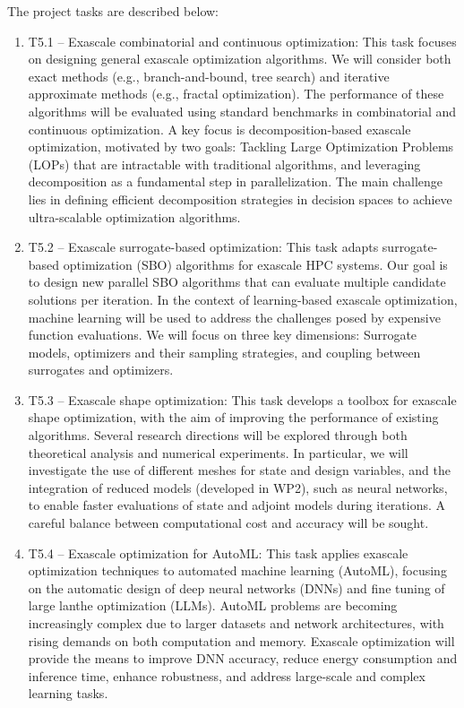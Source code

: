 The project tasks are described below:
\begin{enumerate}
\item T5.1 – Exascale combinatorial and continuous optimization: This task focuses on designing general exascale optimization algorithms. We will consider both exact methods (e.g., branch-and-bound, tree search) and iterative approximate methods (e.g., fractal optimization). The performance of these algorithms will be evaluated using standard benchmarks in combinatorial and continuous optimization. A key focus is decomposition-based exascale optimization, motivated by two goals: Tackling Large Optimization Problems (LOPs) that are intractable with traditional algorithms, and leveraging decomposition as a fundamental step in parallelization. The main challenge lies in defining efficient decomposition strategies in  decision spaces to achieve ultra-scalable optimization algorithms.

 \item T5.2 – Exascale surrogate-based optimization: This task adapts surrogate-based optimization (SBO) algorithms for exascale HPC systems. Our goal is to design new parallel SBO algorithms that can evaluate multiple candidate solutions per iteration. In the context of learning-based exascale optimization, machine learning will be used to address the challenges posed by expensive function evaluations. We will focus on three key dimensions: Surrogate models, optimizers and their sampling strategies, and coupling between surrogates and optimizers.

 \item T5.3 – Exascale shape optimization: This task develops a toolbox for exascale shape optimization, with the aim of improving the performance of existing algorithms. Several research directions will be explored through both theoretical analysis and numerical experiments. In particular, we will investigate the use of different meshes for state and design variables, and the integration of reduced models (developed in WP2), such as neural networks, to enable faster evaluations of state and adjoint models during iterations. A careful balance between computational cost and accuracy will be sought.

 \item T5.4 – Exascale optimization for AutoML:
This task applies exascale optimization techniques to automated machine learning (AutoML), focusing on the automatic design of deep neural networks (DNNs) and fine tuning of large lanthe optimization (LLMs). AutoML problems are becoming increasingly complex due to larger datasets and network architectures, with rising demands on both computation and memory. Exascale optimization will provide the means to improve DNN accuracy, reduce energy consumption and inference time, enhance robustness, and address large-scale and complex learning tasks.
\end{enumerate}

